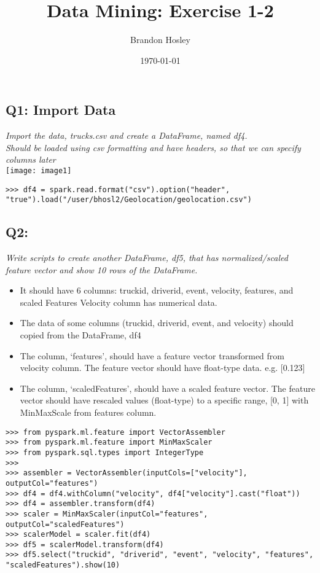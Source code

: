 \documentclass[]{article}
\title{Data Mining: Exercise 1-2}
\author{Brandon Hosley}
\date{\today}
\begin{document}
\maketitle

\vspace{3em}

\subsection*{Q1: Import Data}
\emph{Import the data, trucks.csv and create a DataFrame, named df4. \\
	Should be loaded using csv formatting and have headers, so that we can specify columns later} \\
	\texttt{[image: image1]}
\begin{verbatim}
>>> df4 = spark.read.format("csv").option("header", "true").load("/user/bhosl2/Geolocation/geolocation.csv")
\end{verbatim}

\clearpage
\subsection*{Q2: }
\emph{Write scripts to create another DataFrame, df5, 
	that has normalized/scaled feature vector and
	show 10 rows of the DataFrame.}
	\begin{itemize}[before=\itshape,font=\normalfont]
		\item It should have 6 columns: truckid, driverid, event, velocity, features, and scaled Features Velocity column has numerical data.
		\item The data of some columns (truckid, driverid, event, and velocity) should copied from the DataFrame, df4
		\item The column, ‘features’, should have a feature vector transformed from velocity column. The feature vector should have float-type data. e.g. [0.123]
		\item The column, ‘scaledFeatures’, should have a scaled feature vector. The feature vector should have rescaled values (float-type) to a specific range, [0, 1] with MinMaxScale from features column.
	\end{itemize} 

\begin{verbatim}
>>> from pyspark.ml.feature import VectorAssembler
>>> from pyspark.ml.feature import MinMaxScaler
>>> from pyspark.sql.types import IntegerType
>>>
>>> assembler = VectorAssembler(inputCols=["velocity"], outputCol="features")
>>> df4 = df4.withColumn("velocity", df4["velocity"].cast("float"))
>>> df4 = assembler.transform(df4)
>>> scaler = MinMaxScaler(inputCol="features", outputCol="scaledFeatures")
>>> scalerModel = scaler.fit(df4)
>>> df5 = scalerModel.transform(df4)
>>> df5.select("truckid", "driverid", "event", "velocity", "features", "scaledFeatures").show(10)
\end{verbatim}
\end{document}
